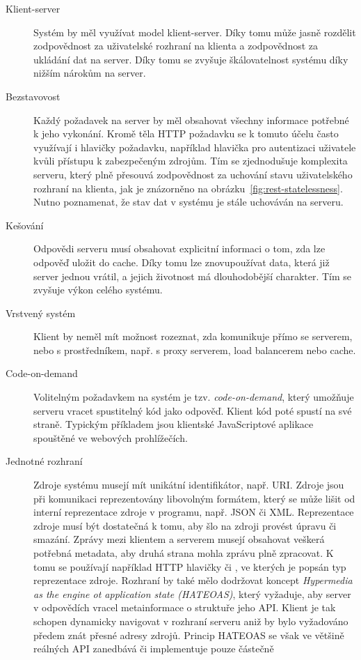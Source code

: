 \begin{description}
    \item [Klient-server] Systém by měl využívat model klient-server. Díky tomu může jasně rozdělit
    zodpovědnost za uživatelské rozhraní na klienta a zodpovědnost za ukládání dat na server. Díky tomu se zvyšuje
    škálovatelnost systému díky nižším nárokům na server.
    \item [Bezstavovost] Každý požadavek na server by měl obsahovat všechny informace potřebné k jeho vykonání.
    Kromě těla \gls{HTTP} požadavku se k tomuto účelu často využívají i hlavičky požadavku,
    například hlavička  pro autentizaci uživatele kvůli přístupu k zabezpečeným zdrojům.
    Tím se zjednodušuje komplexita serveru, který plně přesouvá zodpovědnost za uchování stavu uživatelského rozhraní
    na klienta, jak je znázorněno na obrázku~\ref{fig:rest-statelessness}. Nutno poznamenat, že stav dat v systému
    je stále uchováván na serveru.
    \item [Kešování] Odpovědi serveru musí obsahovat explicitní informaci o tom, zda lze odpověď uložit do cache.
    Díky tomu lze znovupoužívat data, která již server jednou vrátil, a jejich životnost má dlouhodobější charakter.
    Tím se zvyšuje výkon celého systému.
    \item [Vrstvený systém] Klient by neměl mít možnost rozeznat, zda komunikuje přímo se serverem, nebo s prostředníkem,
    např. s proxy serverem, load balancerem nebo cache.
    \item [Code-on-demand] Volitelným požadavkem na systém je tzv. \textit{code-on-demand}, který umožňuje serveru vracet
    spustitelný kód jako odpověď. Klient kód poté spustí na své straně. Typickým příkladem jsou klientské JavaScriptové aplikace spouštěné ve webových prohlížečích.
    \item [Jednotné rozhraní] Zdroje systému musejí mít unikátní identifikátor, např. \gls{URI}. Zdroje jsou při komunikaci reprezentovány libovolným formátem, který
    se může lišit od interní reprezentace zdroje v programu, např. \gls{JSON} či \gls{XML}. Reprezentace zdroje musí být
    dostatečná k tomu, aby šlo na zdroji provést úpravu či smazání. Zprávy mezi klientem a serverem musejí obsahovat veškerá potřebná metadata,
    aby druhá strana mohla zprávu plně zpracovat. K tomu se používají například \gls{HTTP} hlavičky 
    či , ve kterých je popsán typ reprezentace zdroje.
    Rozhraní by také mělo dodržovat koncept \textit{Hypermedia as the engine ot application state (\gls{HATEOAS})},
    který vyžaduje, aby server v odpovědích vracel metainformace o struktuře jeho \gls{API}.
    Klient je tak schopen dynamicky navigovat v rozhraní serveru aniž by bylo vyžadováno předem znát přesné adresy zdrojů.
    Princip \gls{HATEOAS} se však ve většině reálných \gls{API} zanedbává či implementuje pouze částečně
\end{description}


